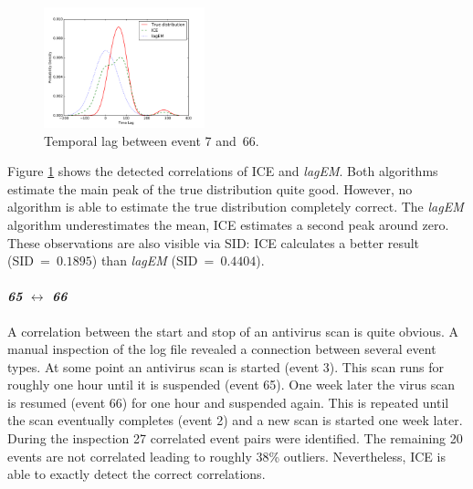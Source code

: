 \documentclass[conference]{IEEEtran}
\theoremstyle{examplestyle}
\newcommand\imgsize{0.415}
\begin{document}
\begin{figure}[!tb]
	\centering
	\includegraphics[width=\imgsize\textwidth]{images/symantec/7-66.pdf}
	\caption{Temporal lag between event 7 and~66.}
	\label{fig:7-66}
\end{figure}

Figure \ref{fig:7-66} shows the detected correlations of \ac{ICE} and \textit{lagEM}. Both algorithms estimate the main peak of the true distribution quite good. However, no algorithm is able to estimate the true distribution completely correct. The \textit{lagEM} algorithm underestimates the mean, \ac{ICE} estimates a second peak around zero. These observations are also visible via \ac{SID}: \ac{ICE} calculates a better result (\ac{SID}~=~$0.1895$) than \textit{lagEM} (\ac{SID}~=~$0.4404$).




\paragraph{\textit{65} \(\leftrightarrow\) \textit{66}} A correlation between the start and stop of an antivirus scan is quite obvious. A manual inspection of the log file revealed a connection between several event types. At some point an antivirus scan is started (event 3). This scan runs for roughly one hour until it is suspended (event 65). One week later the virus scan is resumed (event 66) for one hour and suspended again. This is repeated until the scan eventually completes (event 2) and a new scan is started one week later. During the inspection 27 correlated event pairs were identified. The remaining 20 events are not correlated leading to roughly 38\% outliers. Nevertheless, \ac{ICE} is able to exactly detect the correct correlations.
\end{document}
